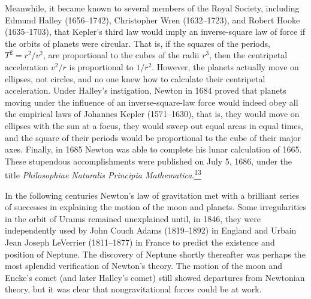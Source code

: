 Meanwhile, it became known to several members of the Royal Society, including
Edmund Halley (1656--1742), Christopher Wren (1632--1723), and Robert Hooke
(1635--1703), that Kepler's third law would imply an inverse-square law of
force if the orbits of planets were circular. That is, if the squares of the
periods, \(T^2=r^2/v^2\), are proportional to the cubes of the radii \(r^3\),
then the centripetal acceleration \(v^2/r\) is proportional to \(1/r^2\).
However, the planets actually move on ellipses, not circles, and no one knew
how to calculate their centripetal acceleration. Under Halley's instigation,
Newton in 1684 proved that planets moving under the influence of an
inverse-square-law force would indeed obey all the empirical laws of Johannes
Kepler (1571--1630), that is, they would move on ellipses with the sun at a
focus, they would sweep out equal areas in equal times, and the square of
their periods would be proportional to the cube of their major axes. Finally,
in 1685 Newton was able to complete his lunar calculation of 1665. These
stupendous accomplishments were published on July 5, 1686, under the title
\emph{Philosophiae Naturalis Principia
Mathematica}.\hyperref[ch1-ref-13]{\textsuperscript{13}}

In the following centuries Newton's law of gravitation met with a brilliant
series of successes in explaining the motion of the moon and planets. Some
irregularities in the orbit of Uranus remained unexplained until, in 1846,
they were independently used by John Couch Adams (1819--1892) in England and
Urbain Jean Joseph LeVerrier (1811--1877) in France to predict the existence
and position of Neptune. The discovery of Neptune shortly thereafter was
perhaps the most splendid verification of Newton's theory. The motion of the
moon and Encke's comet (and later Halley's comet) still showed departures from
Newtonian theory, but it was clear that nongravitational forces could be at
work.

